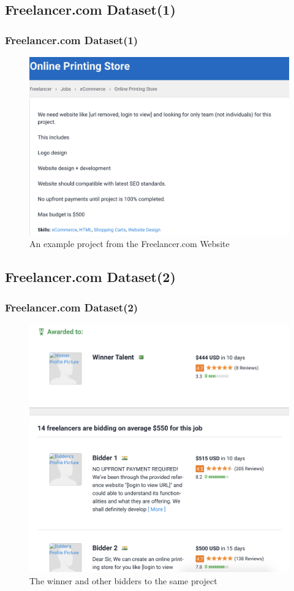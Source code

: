 \documentclass{beamer}
\begin{document}
\subsection{Freelancer.com Dataset(1)} 
\begin{frame}
\frametitle{Freelancer.com Dataset(1)}

\begin{figure}
	\includegraphics[scale=0.3]{images/FreelancerExample} 
	\caption{An example project from the Freelancer.com Website}
\end{figure}
\end{frame}

\subsection{Freelancer.com Dataset(2)} 
\begin{frame}
\frametitle{Freelancer.com Dataset(2)}

\begin{figure}
\includegraphics[scale=0.2]{images/FreelancerTalentExample} 
\caption{The winner and other bidders to the same project}
\end{figure}
\end{frame}
\end{document}
